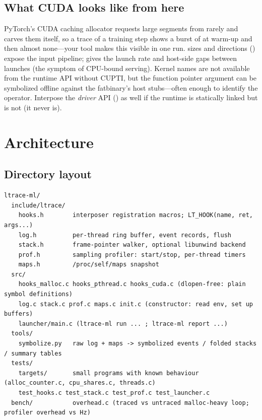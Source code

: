 \subsection{What CUDA looks like from here}

PyTorch's CUDA caching allocator requests large segments from  rarely and carves them itself, so a trace of a training step shows a burst of  at warm-up and then almost none---your tool makes this visible in one run.  sizes and directions () expose the input pipeline;  gives the launch rate and host-side gaps between launches (the symptom of CPU-bound serving). Kernel names are not available from the runtime API without CUPTI, but the function pointer argument can be symbolized offline against the fatbinary's host stubs---often enough to identify the operator. Interpose the \emph{driver} API () as well if the runtime is statically linked but  is not (it never is).

\section{Architecture}

\subsection{Directory layout}

\begin{lstlisting}[style=plain]
ltrace-ml/
  include/ltrace/
    hooks.h        interposer registration macros; LT_HOOK(name, ret, args...)
    log.h          per-thread ring buffer, event records, flush
    stack.h        frame-pointer walker, optional libunwind backend
    prof.h         sampling profiler: start/stop, per-thread timers
    maps.h         /proc/self/maps snapshot
  src/
    hooks_malloc.c hooks_pthread.c hooks_cuda.c (dlopen-free: plain symbol definitions)
    log.c stack.c prof.c maps.c init.c (constructor: read env, set up buffers)
    launcher/main.c (ltrace-ml run ... ; ltrace-ml report ...)
  tools/
    symbolize.py   raw log + maps -> symbolized events / folded stacks / summary tables
  tests/
    targets/       small programs with known behaviour (alloc_counter.c, cpu_shares.c, threads.c)
    test_hooks.c test_stack.c test_prof.c test_launcher.c
  bench/           overhead.c (traced vs untraced malloc-heavy loop; profiler overhead vs Hz)
\end{lstlisting}

